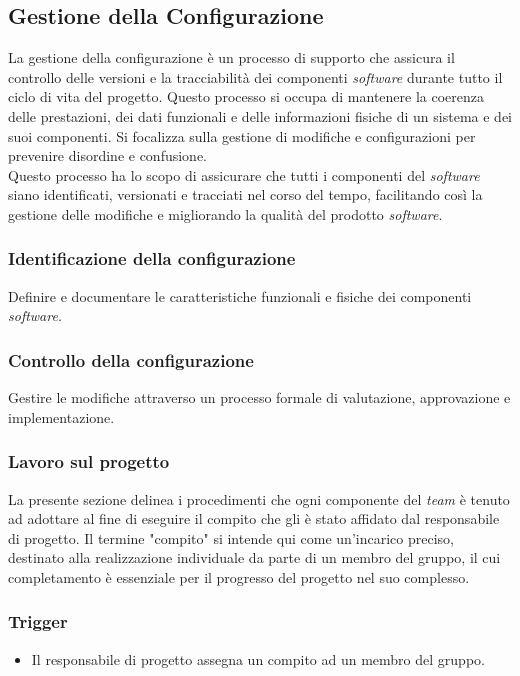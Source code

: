 \subsection{Gestione della Configurazione}
La gestione della configurazione è un processo di supporto che assicura il
controllo delle versioni e la tracciabilità dei componenti \textit{software}
durante tutto il ciclo di vita del progetto.
Questo processo si occupa di mantenere la coerenza delle prestazioni, dei dati
funzionali e delle informazioni fisiche di un sistema e dei suoi componenti.
Si focalizza sulla gestione di modifiche e configurazioni per prevenire
disordine e confusione. \\
Questo processo ha lo scopo di assicurare che tutti i componenti del
\textit{software} siano identificati, versionati e tracciati nel corso del
tempo, facilitando così la gestione delle modifiche e migliorando la qualità
del prodotto \textit{software}.




\subsubsection{Identificazione della configurazione} 
Definire e documentare le caratteristiche funzionali e fisiche dei componenti
  \textit{software}.




\subsubsection{Controllo della configurazione} 
Gestire le modifiche attraverso un processo formale di valutazione, approvazione 
e implementazione.



\subsubsection{Lavoro sul progetto}
\label{lavoro-sul-progetto}
La presente sezione delinea i procedimenti che ogni componente del \textit{team} è tenuto ad adottare al fine di eseguire il compito che gli è stato affidato dal responsabile di progetto.
Il termine "compito" si intende qui come un'incarico preciso, destinato alla realizzazione individuale da parte di un membro del gruppo, il cui completamento è essenziale per il progresso del progetto nel suo complesso.

\subsubsection*{Trigger}
\begin{itemize}
	\item Il responsabile di progetto assegna un compito ad un membro del
	      gruppo.
\end{itemize}

